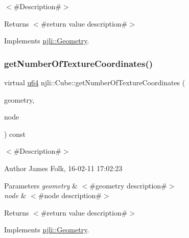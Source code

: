 $<$\#\+Description\#$>$

\begin{DoxyReturn}{Returns}
$<$\#return value description\#$>$ 
\end{DoxyReturn}


Implements \mbox{\hyperlink{classnjli_1_1_geometry_ac857e830af897450652aee0922e62e20}{njli\+::\+Geometry}}.

\mbox{\label{classnjli_1_1_cube_a286147feca746833690715526014f6c2}} 
\subsubsection{\texorpdfstring{get\+Number\+Of\+Texture\+Coordinates()}{getNumberOfTextureCoordinates()}}
{\footnotesize\ttfamily virtual \mbox{\hyperlink{_util_8h_ad758b7a5c3f18ed79d2fcd23d9f16357}{u64}} njli\+::\+Cube\+::get\+Number\+Of\+Texture\+Coordinates (\begin{DoxyParamCaption}\item[{\mbox{\hyperlink{classnjli_1_1_level_of_detail}{Level\+Of\+Detail}} $\ast$}]{geometry,  }\item[{\mbox{\hyperlink{classnjli_1_1_node}{Node}} $\ast$}]{node }\end{DoxyParamCaption}) const\hspace{0.3cm}{\ttfamily [virtual]}}



$<$\#\+Description\#$>$ 

\begin{DoxyAuthor}{Author}
James Folk, 16-\/02-\/11 17\+:02\+:23
\end{DoxyAuthor}

\begin{DoxyParams}{Parameters}
{\em geometry} & $<$\#geometry description\#$>$ \\
\hline
{\em node} & $<$\#node description\#$>$\\
\hline
\end{DoxyParams}
\begin{DoxyReturn}{Returns}
$<$\#return value description\#$>$ 
\end{DoxyReturn}


Implements \mbox{\hyperlink{classnjli_1_1_geometry_a495713b5eea24429df8899cfaa59c832}{njli\+::\+Geometry}}.

